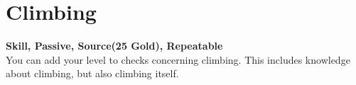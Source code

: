 \section{Climbing}\label{sec:climbing}
\textbf{Skill, Passive, Source(25 Gold), Repeatable}\\
You can add your level to checks concerning climbing. This includes knowledge about climbing, but also climbing itself.